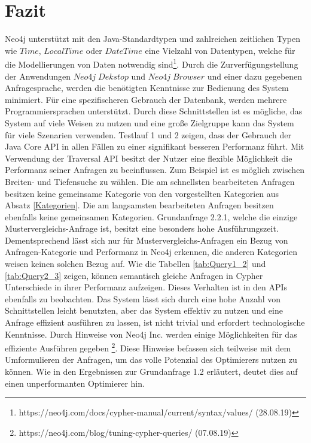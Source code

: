 \section{Fazit}
Neo4j unterstützt mit den Java-Standardtypen und zahlreichen zeitlichen Typen wie $Time$, $LocalTime$ oder $DateTime$ eine Vielzahl von Datentypen, welche für die Modellierungen von Daten notwendig sind\footnote{https://neo4j.com/docs/cypher-manual/current/syntax/values/ (28.08.19)}. Durch die Zurverfügungstellung der Anwendungen $Neo4j\; Dekstop$ und $Neo4j\; Browser$ und einer dazu gegebenen Anfragesprache, werden die benötigten Kenntnisse zur Bedienung des System minimiert. Für eine spezifischeren Gebrauch der Datenbank, werden mehrere Programmiersprachen unterstützt. Durch diese Schnittstellen ist es mögliche, das System auf viele Weisen zu nutzen und eine große Zielgruppe kann das System für viele Szenarien verwenden. \newline 
Testlauf 1 und 2 zeigen, dass der Gebrauch der Java Core API in allen Fällen zu einer signifikant besseren Performanz führt. Mit Verwendung der Traversal API besitzt der Nutzer eine flexible Möglichkeit die Performanz seiner Anfragen zu beeinflussen. Zum Beispiel ist es möglich zwischen Breiten- und Tiefensuche zu wählen. Die am schnellsten bearbeiteten Anfragen besitzen keine gemeinsame Kategorie von den vorgestellten Kategorien aus Absatz \ref{Kategorien}. Die am langsamsten bearbeiteten Anfragen besitzen ebenfalls keine gemeinsamen Kategorien. Grundanfrage 2.2.1, welche die einzige Mustervergleichs-Anfrage ist, besitzt eine besonders hohe Ausführungszeit. Dementsprechend lässt sich nur für Mustervergleichs-Anfragen ein Bezug von Anfragen-Kategorie und Performanz in Neo4j erkennen, die anderen Kategorien weisen keinen solchen Bezug auf. \newline
Wie die Tabellen \ref{tab:Query1_2} und \ref{tab:Query2_3} zeigen, können semantisch gleiche Anfragen in Cypher Unterschiede in ihrer Performanz aufzeigen. Dieses Verhalten ist in den APIs ebenfalls zu beobachten. Das System lässt sich durch eine hohe Anzahl von Schnittstellen leicht benutzten, aber das System effektiv zu nutzen und eine Anfrage effizient ausführen zu lassen, ist nicht trivial und erfordert technologische Kenntnisse. Durch Hinweise von Neo4j Inc. werden einige Möglichkeiten für das effiziente Ausführen gegeben \footnote{https://neo4j.com/blog/tuning-cypher-queries/ (07.08.19)}. Diese Hinweise befassen sich teilweise mit dem Umformulieren der Anfragen, um das volle Potenzial des Optimierers nutzen zu können. Wie in den Ergebnissen zur Grundanfrage 1.2 erläutert, deutet dies auf einen unperformanten Optimierer hin. \newline
